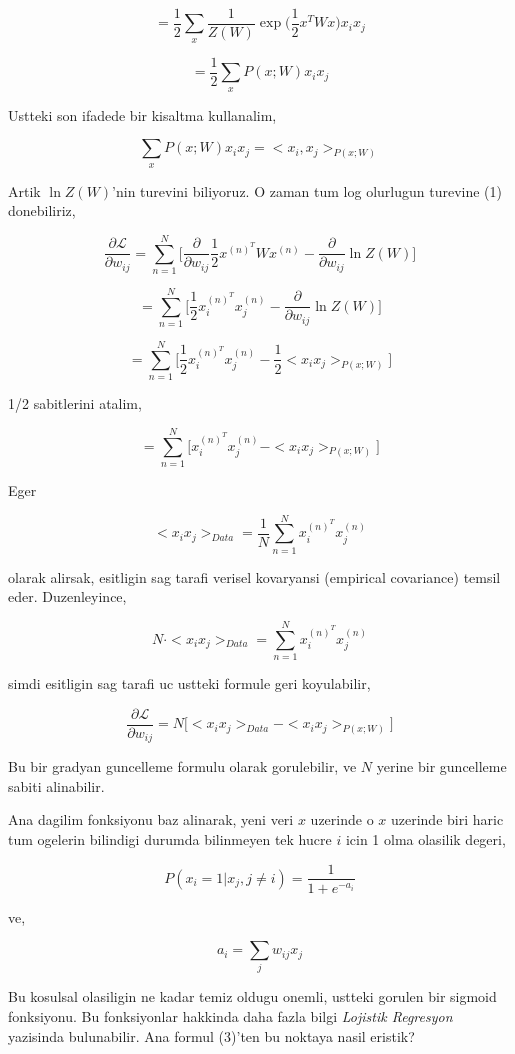 \documentclass[12pt,fleqn]{article}\usepackage{../common}
\begin{document}
$$ 
= 
\frac{1}{2}  \sum_x \frac{1}{Z(W)}  \exp \big( \frac{1}{2} x^T W x \big) x_i x_j
$$

$$ 
= 
\frac{1}{2}  \sum_x P(x;W) x_i x_j
$$

Ustteki son ifadede bir kisaltma kullanalim,

$$ 
\sum_x P(x;W) x_i x_j =  <x_i,x_j>_{P(x;W)}
$$

Artik $\ln Z(W)$'nin turevini biliyoruz. O zaman tum log olurlugun turevine
(1) donebiliriz, 

$$  
\frac{\partial \mathcal{L}}{\partial w_{ij}} = 
\sum _{n=1}^{N} \bigg[ 
\frac{\partial}{\partial w_{ij}}  \frac{1}{2} x^{(n)^T} W x^{(n)} - 
\frac{\partial}{\partial w_{ij}}  \ln Z(W) \bigg]
$$


$$  
=
\sum _{n=1}^{N} 
\bigg[ 
\frac{1}{2} x_i^{(n)^T}x_j^{(n)} - 
\frac{\partial}{\partial w_{ij}}  \ln Z(W) 
\bigg]
$$

$$  
=
\sum _{n=1}^{N} 
\bigg[ 
\frac{1}{2} x_i^{(n)^T}x_j^{(n)} - 
\frac{1}{2}<x_ix_j>_{P(x;W)}
\bigg]
$$ 

1/2 sabitlerini atalim, 

$$  
=
\sum _{n=1}^{N} 
\bigg[ 
 x_i^{(n)^T}x_j^{(n)} - <x_ix_j>_{P(x;W)}
\bigg]
$$

Eger 

$$
<x_ix_j>_{Data} = \frac{1}{N} \sum _{n=1}^{N}  x_i^{(n)^T}x_j^{(n)}
$$

olarak alirsak, esitligin sag tarafi verisel kovaryansi (empirical
covariance) temsil eder. Duzenleyince,

$$ 
N \cdot <x_ix_j>_{Data} = \sum _{n=1}^{N}  x_i^{(n)^T}x_j^{(n)}
$$

simdi esitligin sag tarafi uc ustteki formule geri koyulabilir,

$$ 
\frac{\partial \mathcal{L}}{\partial w_{ij}}  = 
N \big[<x_ix_j>_{Data}  - <x_ix_j>_{P(x;W)} \big] 
$$

Bu bir gradyan guncelleme formulu olarak gorulebilir, ve $N$ yerine bir
guncelleme sabiti alinabilir. 

Ana dagilim fonksiyonu baz alinarak, yeni veri $x$ uzerinde o $x$ uzerinde
biri haric tum ogelerin bilindigi durumda bilinmeyen tek hucre $i$ icin 1
olma olasilik degeri,

$$ P(x_i = 1 | x_j, j \ne i) = \frac{1}{1 + e^{-a_i}} $$

ve,

$$ a_i = \sum_j  w_{ij}x_j $$

Bu kosulsal olasiligin ne kadar temiz oldugu onemli, ustteki gorulen bir
sigmoid fonksiyonu. Bu fonksiyonlar hakkinda daha fazla bilgi {\em Lojistik
  Regresyon} yazisinda bulunabilir. Ana formul (3)'ten bu noktaya nasil
eristik?
\end{document}
